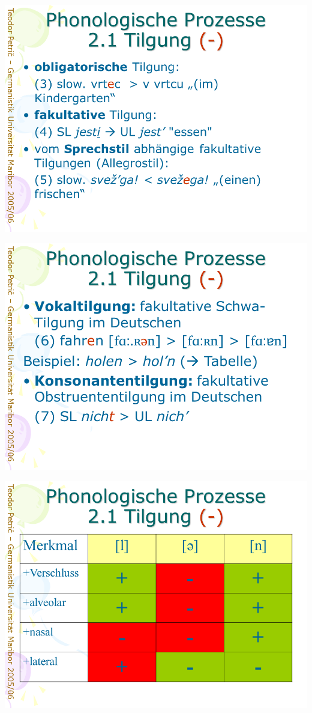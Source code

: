 \documentclass[
  letterpaper,
]{scrbook}
\begin{document}
\includegraphics[width=1\textwidth,height=\textheight]{./pictures/prozesse/prozesse_9.PNG}

\includegraphics[width=1\textwidth,height=\textheight]{./pictures/prozesse/prozesse_10.PNG}

\includegraphics[width=1\textwidth,height=\textheight]{./pictures/prozesse/prozesse_11.PNG}
\end{document}
